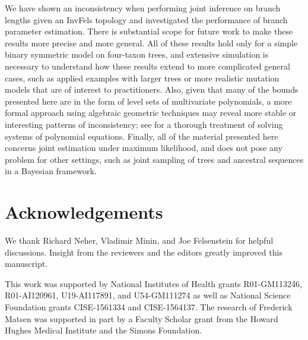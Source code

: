\documentclass[11pt]{article}
\newcommand{\beginsupplement}{%
        \setcounter{table}{0}
        \renewcommand{\thetable}{S\arabic{table}}%
        \setcounter{figure}{0}
        \renewcommand{\thefigure}{S\arabic{figure}}%
     }
\begin{document}

We have shown an inconsistency when performing joint inference on branch lengths given an InvFels topology and investigated the performance of branch parameter estimation.
There is substantial scope for future work to make these results more precise and more general.
All of these results hold only for a simple binary symmetric model on four-taxon trees, and extensive simulation is necessary to understand how these results extend to more complicated general cases, such as applied examples with larger trees or more realistic mutation models that are of interest to practitioners.
Also, given that many of the bounds presented here are in the form of level sets of multivariate polynomials, a more formal approach using algebraic geometric techniques may reveal more stable or interesting patterns of inconsistency; see \citet{Sturmfels2002} for a thorough treatment of solving systems of polynomial equations.
Finally, all of the material presented here concerns joint estimation under maximum likelihood, and does not pose any problem for other settings, such as joint sampling of trees and ancestral sequences in a Bayesian framework.


\section*{Acknowledgements}
We thank Richard Neher, Vladimir Minin, and Joe Felsenstein for helpful discussions.
Insight from the reviewers and the editors greatly improved this manuscript.

This work was supported by National Institutes of Health grants R01-GM113246, R01-AI120961, U19-AI117891, and U54-GM111274 as well as National Science Foundation grants CISE-1561334 and CISE-1564137.
The research of Frederick Matsen was supported in part by a Faculty Scholar grant from the Howard Hughes Medical Institute and the Simons Foundation.




\newpage
\beginsupplement


\end{document}
